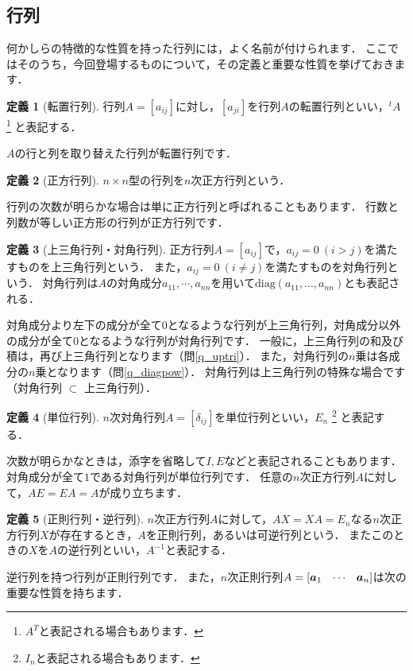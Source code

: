 \documentclass[dvipdfmx]{jsarticle}
\theoremstyle{definition}
\newtheorem{definition}{定義}[section]
\newcommand{\diag}[1]{\mathrm{diag}(#1)}
\newcommand{\tp}[1]{{}^{t}#1}
\newcommand{\hs}[1]{\hspace{#1em}}
\newcommand{\hv}[3]{[#1 \hs{0.8} #2 \hs{0.8} #3]}
\begin{document}
\subsection{行列}  \label{subsec_mat}
何かしらの特徴的な性質を持った行列には，よく名前が付けられます．
ここではそのうち，今回登場するものについて，その定義と重要な性質を挙げておきます．
\begin{definition}[転置行列]
    行列$A = [a_{ij}]$に対し，$[a_{ji}]$を行列$A$の転置行列といい，$\tp{A}$
    \footnote{
        $A^{T}$と表記される場合もあります．
    }
    と表記する．
\end{definition}
$A$の行と列を取り替えた行列が転置行列です．
\begin{definition}[正方行列]
    $n \times n$型の行列を$n$次正方行列という．
\end{definition}
行列の次数が明らかな場合は単に正方行列と呼ばれることもあります．
行数と列数が等しい正方形の行列が正方行列です．
\begin{definition}[上三角行列・対角行列]
    正方行列$A = [a_{ij}]$で，$a_{ij} = 0 \ (i > j)$を満たすものを上三角行列という．
    また，$a_{ij} = 0 \ (i \neq j)$を満たすものを対角行列という．
    対角行列は$A$の対角成分$a_{11}, \cdots, a_{nn}$を用いて$\diag{a_{11}, \ldots, a_{nn}}$とも表記される．
\end{definition}
対角成分より左下の成分が全て$0$となるような行列が上三角行列，対角成分以外の成分が全て$0$となるような行列が対角行列です．
一般に，上三角行列の和及び積は，再び上三角行列となります（問\ref{q_uptri}）．
また，対角行列の$n$乗は各成分の$n$乗となります（問\ref{q_diagpow}）．
対角行列は上三角行列の特殊な場合です（対角行列 $\subset$ 上三角行列）．
\begin{definition}[単位行列]
    $n$次対角行列$A = [\delta_{ij}]$を単位行列といい，$E_n$
    \footnote{
        $I_n$と表記される場合もあります．
    }
    と表記する．
\end{definition}
次数が明らかなときは，添字を省略して$I, E$などと表記されることもあります．
対角成分が全て$1$である対角行列が単位行列です．
任意の$n$次正方行列$A$に対して，$AE = EA = A$が成り立ちます．
\begin{definition}[正則行列・逆行列]
    $n$次正方行列$A$に対して，$AX = XA = E_n$なる$n$次正方行列$X$が存在するとき，$A$を正則行列，あるいは可逆行列という．
    またこのときの$X$を$A$の逆行列といい，$A^{-1}$と表記する．
\end{definition}
逆行列を持つ行列が正則行列です．
また，$n$次正則行列$A = \hv{\bm{a}_1}{\cdots}{\bm{a}_n}$は次の重要な性質を持ちます．
\end{document}
